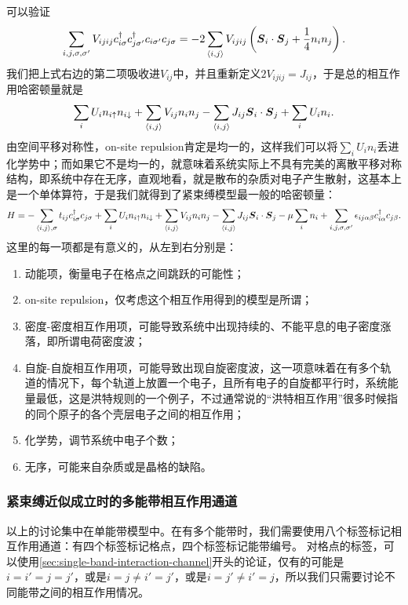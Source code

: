 可以验证
\[
    \sum_{i, j, \sigma, \sigma'} V_{i j i j} c^\dagger_{i \sigma} c^\dagger_{j \sigma'} c_{i \sigma'} c_{j \sigma} = - 2 \sum_{\langle i, j \rangle} V_{i j i j} \left( \vb*{S}_{i} \cdot \vb*{S}_j + \frac{1}{4} n_i n_j \right).
\]
我们把上式右边的第二项吸收进$V_{ij}$中，并且重新定义$2V_{ijij}=J_{ij}$，于是总的相互作用哈密顿量就是
\[
    \sum_{i} U_i n_{i \uparrow} n_{i \downarrow} + \sum_{\langle i, j \rangle} V_{ij} n_i n_j - \sum_{\langle i, j \rangle} J_{i j} \vb*{S}_{i} \cdot \vb*{S}_j + \sum_{i} U_i n_i.
\]
由空间平移对称性，on-site repulsion肯定是均一的，这样我们可以将$\sum_i U_i n_i$丢进化学势中；而如果它不是均一的，就意味着系统实际上不具有完美的离散平移对称结构，即系统中存在无序，直观地看，就是散布的杂质对电子产生散射，这基本上是一个单体算符，于是我们就得到了紧束缚模型最一般的哈密顿量：
\begin{equation}
    H = - \sum_{\langle i, j \rangle, \sigma} t_{ij} c^\dagger_{i \sigma} c_{j \sigma} 
    + \sum_{i} U_i n_{i \uparrow} n_{i \downarrow} 
    + \sum_{\langle i, j \rangle} V_{ij} n_i n_j - \sum_{\langle i, j \rangle} J_{i j} \vb*{S}_{i} \cdot \vb*{S}_j 
    - \mu \sum_i n_i + \sum_{i, j, \sigma, \sigma'} \epsilon_{ij\alpha \beta} c^\dagger_{i \alpha} c_{j \beta}.  
\end{equation}
这里的每一项都是有意义的，从左到右分别是：
\begin{enumerate}
    \item 动能项，衡量电子在格点之间跳跃的可能性；
    \item on-site repulsion，仅考虑这个相互作用得到的模型是所谓；
    \item 密度-密度相互作用项，可能导致系统中出现持续的、不能平息的电子密度涨落，即所谓电荷密度波；
    \item 自旋-自旋相互作用项，可能导致出现自旋密度波，这一项意味着在有多个轨道的情况下，每个轨道上放置一个电子，且所有电子的自旋都平行时，系统能量最低，这是洪特规则的一个例子，不过通常说的“洪特相互作用”很多时候指的同个原子的各个壳层电子之间的相互作用；
    \item 化学势，调节系统中电子个数；
    \item 无序，可能来自杂质或是晶格的缺陷。
\end{enumerate}

\subsubsection{紧束缚近似成立时的多能带相互作用通道}

以上的讨论集中在单能带模型中。在有多个能带时，我们需要使用八个标签标记相互作用通道：有四个标签标记格点，四个标签标记能带编号。
对格点的标签，可以使用\autoref{sec:single-band-interaction-channel}开头的论证，仅有的可能是$i=i'=j=j'$，或是$i=j \neq i'=j'$，或是$i=j' \neq i' = j$，所以我们只需要讨论不同能带之间的相互作用情况。

